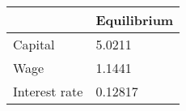\begin{tabular}{ll}
& Equilibrium \\ 
\hline 
Capital & 5.0211 \\ 
Wage & 1.1441 \\ 
Interest rate & 0.12817 \\ 
\hline 
\end{tabular}